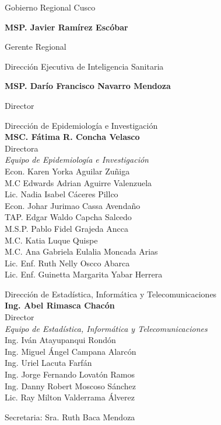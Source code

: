 \documentclass[12pt,a4paper,openany]{book}
\begin{document}
	
	\begin{center}
		{\large Gobierno Regional Cusco}
		
		\textbf{MSP. Javier Ramírez Escóbar}
		
		Gerente Regional \vspace{1.0cm}
		
		Dirección Ejecutiva de Inteligencia Sanitaria
		
		\textbf{MSP. Darío Francisco Navarro Mendoza}
		
		Director
		
		\vspace{1.5cm}
		\noindent
		\begin{minipage}[t]{.45\textwidth}
			\centering
			Dirección de Epidemiología e Investigación  \\
			\textbf{MSC. Fátima R. Concha Velasco}\\
			Directora \vspace{1.0cm}\\
			\textit{Equipo de Epidemiología e Investigación }\vspace{.5cm}\\
			Econ. Karen Yorka Aguilar Zuñiga \\
			M.C Edwards Adrian Aguirre Valenzuela \\
			Lic. Nadia Isabel Cáceres Pillco \\
			Econ. Johar Jurimao Cassa Avendaño \\
			TAP. Edgar Waldo Capcha Salcedo \\
			M.S.P. Pablo Fidel Grajeda Ancca \\
			M.C. Katia Luque Quispe \\
			M.C. Ana Gabriela Eulalia Moncada Arias \\
			Lic. Enf. Ruth Nelly Oscco Abarca \\
			Lic. Enf. Guinetta Margarita Yabar Herrera \vspace{1.5cm}\\	
		\end{minipage}
		\hfill
		\noindent
		\begin{minipage}[t]{.45\textwidth}
			\centering
			Dirección de Estadística, Informática y Telecomunicaciones\\
			\textbf{Ing. Abel Rimasca Chacón} \\
			Director \vspace{1.0cm} \\
			\textit{Equipo de Estadística, Informática y Telecomunicaciones} \vspace{.5cm} \\
			Ing. Iván Atayupanqui Rondón \\
			Ing. Miguel Ángel Campana Alarcón \\
			Ing. Uriel Lacuta Farfán \\
			Ing. Jorge Fernando Lovatón Ramos \\
			Ing. Danny Robert Moscoso Sánchez \\
			Lic. Ray Milton Valderrama Álverez \vspace{1.5cm}\\
		\end{minipage}
		Secretaria: Sra. Ruth Baca Mendoza
	\end{center}
\end{document}
